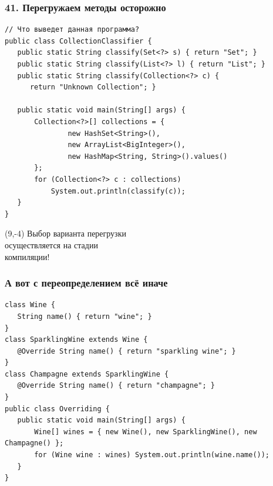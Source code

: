 \documentclass[xetex,mathserif,serif]{beamer}
\begin{document}
	\begin{frame}[fragile]
		\frametitle{41. Перегружаем методы осторожно}
		\begin{small}
			\begin{verbatim}
// Что выведет данная программа?
public class CollectionClassifier {
   public static String classify(Set<?> s) { return "Set"; }
   public static String classify(List<?> l) { return "List"; }
   public static String classify(Collection<?> c) { 
      return "Unknown Collection"; }

   public static void main(String[] args) {
       Collection<?>[] collections = {
               new HashSet<String>(),
               new ArrayList<BigInteger>(),
               new HashMap<String, String>().values()
       };
       for (Collection<?> c : collections)
           System.out.println(classify(c));
   }
}
			\end{verbatim}
		\end{small}
		\pause
		\begin{textblock}{3}(9,-4)
			Выбор варианта перегрузки \\
			осуществляется на стадии \\
			компиляции!
		\end{textblock}
	\end{frame}

	\begin{frame}[fragile]
		\frametitle{А вот с переопределением всё иначе}
		\begin{small}
			\begin{verbatim}
class Wine {
   String name() { return "wine"; }
}
class SparklingWine extends Wine {
   @Override String name() { return "sparkling wine"; }
}
class Champagne extends SparklingWine {
   @Override String name() { return "champagne"; }
}
public class Overriding {
   public static void main(String[] args) {
       Wine[] wines = { new Wine(), new SparklingWine(), new Champagne() };
       for (Wine wine : wines) System.out.println(wine.name());
   }
}
			\end{verbatim}
		\end{small}
	\end{frame}
\end{document}
